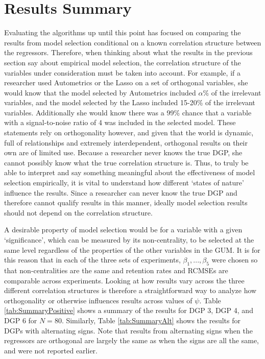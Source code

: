  








\newpage

\section{Results Summary}

Evaluating the algorithms up until this point has focused on comparing the results from model selection conditional on a known correlation structure between the regressors. Therefore, when thinking about what the results in the previous section say about empirical model selection, the correlation structure of the variables under consideration must be taken into account. For example, if a researcher used Autometrics or the Lasso on a set of orthogonal variables, she would know that the model selected by Autometrics included $\alpha$\% of the irrelevant variables, and the model selected by the Lasso included 15-20\% of the irrelevant variables. Additionally she would know there was a 99\% chance that a variable with a signal-to-noise ratio of 4 was included in the selected model. These statements rely on orthogonality however, and given that the world is dynamic, full of relationships and extremely interdependent, orthogonal results on their own are of limited use. Because a researcher never knows the true DGP, she cannot possibly know what the true correlation structure is. Thus, to truly be able to interpret and say something meaningful about the effectiveness of model selection empirically, it is vital to understand how different `states of nature' influence the results. Since a researcher can never know the true DGP and therefore cannot qualify results in this manner, ideally model selection results should not depend on the correlation structure.

A desirable property of model selection would be for a variable with a given `significance', which can be measured by its non-centrality, to be selected at the same level regardless of the properties of the other variables in the GUM. It is for this reason that in each of the three sets of experiments, $\beta_{1},...,\beta_{5}$ were chosen so that non-centralities are the same and retention rates and RCMSEs are comparable across experiments. Looking at how results vary across the three different correlation structures is therefore a straightforward way to analyze how orthogonality or otherwise influences results across values of $\psi$. Table \ref{tab:SummaryPositive} shows a summary of the results for DGP 3, DGP 4, and DGP 6 for $N=80$. Similarly, Table \ref{tab:SummaryAlt} shows the results for DGPs with alternating signs. Note that results from alternating signs when the regressors are orthogonal are largely the same as when the signs are all the same, and were not reported earlier. 

